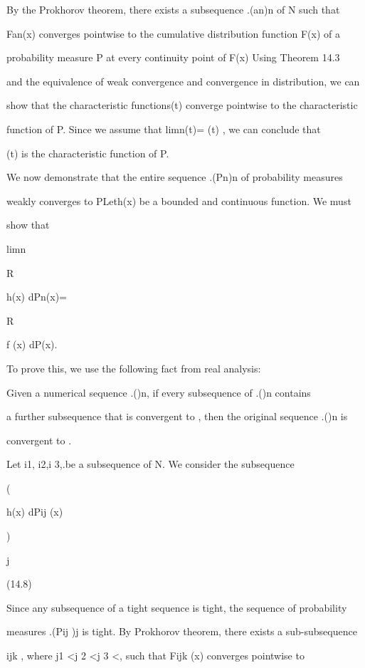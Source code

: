 By the Prokhorov theorem, there exists a subsequence .(an)n of N such that

Fan(x) converges pointwise to the cumulative distribution function F(x) of a

probability measure P at every continuity point of F(x) Using Theorem 14.3

and the equivalence of weak convergence and convergence in distribution, we can

show that the characteristic functions\phian (t) converge pointwise to the characteristic

function of P. Since we assume that limn\to\infty \phian(t)= \phi(t) , we can conclude that

\phi(t) is the characteristic function of P.

We now demonstrate that the entire sequence .(Pn)n of probability measures

weakly converges to PLeth(x) be a bounded and continuous function. We must

show that

limn\to\infty

\int

R

h(x) dPn(x)=

\int

R

f (x) dP(x).

To prove this, we use the following fact from real analysis:

Given a numerical sequence .(\alphan)n, if every subsequence of .(\alphan)n contains

a further subsequence that is convergent to \beta, then the original sequence .(\alphan)n is

convergent to \beta.

Let i1, i2,i 3,.be a subsequence of N. We consider the subsequence

( \int

h(x) dPij (x)

)

j

(14.8)

Since any subsequence of a tight sequence is tight, the sequence of probability

measures .(Pij )j is tight. By Prokhorov theorem, there exists a sub-subsequence

ijk , where j1 <j 2 <j 3 <\cdot\cdot\cdot , such that Fijk (x) converges pointwise to

